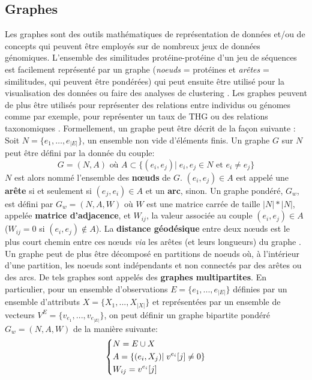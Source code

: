 \subsection{Graphes}\label{chap2graph}
Les graphes sont des outils mathématiques de représentation de données et/ou de concepts qui peuvent être employés sur de nombreux jeux de données génomiques. L'ensemble des similitudes protéine-protéine d'un jeu de séquences est facilement représenté par un graphe (\textit{noeuds} = protéines et \textit{arêtes} = similitudes, qui peuvent être pondérées) qui peut ensuite être utilisé pour la visualisation des données ou faire des analyses de clustering \citep{Brohee2006,li2010computational}. Les graphes peuvent de plus être utilisés pour représenter des relations entre individus ou génomes comme par exemple, pour représenter un taux de THG ou des relations taxonomiques \citep{Lima-Mendez2008}. Formellement, un graphe peut être décrit de la façon suivante \citep{naim2011reseaux}: \\
Soit $N=\{e_{1},\dots,e_{|E|}\}$, un ensemble non vide d'éléments finis. Un graphe $G$ sur $N$ peut être défini par la donnée du couple:
\begin{equation}
G=(N,A) \textrm{ où } A \subset \{(e_{i},e_{j}) |\; e_{i},e_{j} \in N \textrm{ et } e_{i} \neq e_{j}\}
\end{equation}
$N$ est alors nommé l'ensemble des \textbf{nœuds} de $G$. $(e_{i},e_{j}) \in A$ est appelé une \textbf{arête} si et seulement si $(e_{j},e_{i}) \in A$ et un \textbf{arc}, sinon. Un graphe pondéré, $G_{w}$, est défini par $G_{w}=(N,A,W)$ où $W$ est une matrice carrée de taille $|N|*|N|$, appelée \textbf{matrice d'adjacence}, et $W_{ij}$, la valeur associée au couple $(e_{i},e_{j}) \in A$ ($W_{ij}=0$ si $(e_{i},e_{j}) \notin A$). La \textbf{distance géodésique} entre deux nœuds est le plus court chemin entre ces nœuds \textit{via} les arêtes (et leurs longueurs) du graphe \citep{han2012data}. Un graphe peut de plus être décomposé en partitions de noeuds où, à l'intérieur d'une partition, les noeuds sont indépendants et non connectés par des arêtes ou des arcs. De tels graphes sont appelés des \textbf{graphes multipartites}. En particulier, pour un ensemble d'observations $E=\{e_{1},...,e_{|E|}\}$ définies par un ensemble d'attributs $X=\{X_{1},...,X_{|X|}\}$ et représentées par un ensemble de vecteurs $V^{E}=\{v_{e_{1}},...,v_{e_{|E|}}\}$, on peut définir un graphe bipartite pondéré $G_{w}=(N,A,W)$ de la manière suivante:
\begin{equation}\label{eqbipartite}
\begin{dcases}
N=E \cup X\\
A= \{(e_{i},X_{j}) |\; v^{e_{i}}[j] \neq 0 \} \\
W_{ij} = v^{e_{i}}[j]
\end{dcases}
\end{equation}
